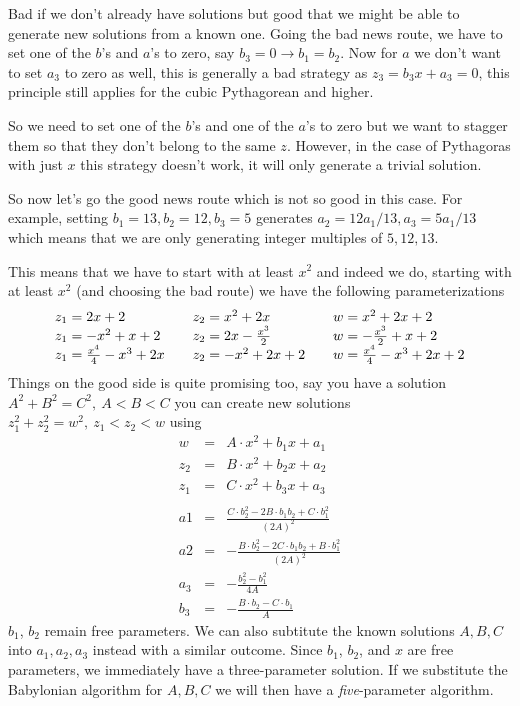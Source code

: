 \documentclass[aps,preprint,preprintnumbers,nofootinbib,showpacs,prd]{revtex4-1}
\newcommand{\ba}{\begin{array}}
\newcommand{\ea}{\end{array}}
\newcommand{\nbea}{\begin{eqnarray*}}
\newcommand{\neea}{\end{eqnarray*}}
\begin{document}
Bad if we don't already have solutions but good that we might be able to generate new solutions from a known one. Going the bad news route, we have to set one of the $b$'s and $a$'s to zero, say $
b_3=0 \to b_1 = b_2$. Now for $a$ we don't want to set $a_3$ to zero as well, this is generally a bad strategy as $z_3 = b_3 x + a_3 = 0$, this principle still applies for the cubic Pythagorean and higher.

So we need to set one of the $b$'s and one of the $a$'s to zero but we want to stagger them so that they don't belong to the same $z$. However, in the case of Pythagoras with just $x$ this strategy doesn't work, it will only generate a trivial solution.

So now let's go the good news route which is not so good in this case. For example, setting $b_1 = 13, b_2 = 12, b_3 = 5$ generates $a_2 = 12 a_1/13, a_3 = 5 a_1/13$ which means that we are only generating integer multiples of $5,12,13$.

This means that we have to start with at least $x^2$ and indeed we do, starting with at least $x^2$ (and choosing the bad route) we have the following parameterizations
%
\nbea
\ba{l l l}
z_1 = 2x + 2          &~~~ z_2 = x^2 + 2x &~~~ w = x^2 + 2x + 2 \\
z_1 = -x^2 + x + 2 &~~~ z_2 = 2x - \frac{x^3}{2} &~~~ w = -\frac{x^3}{2} + x + 2 \\
z_1 = \frac{x^4}{4} - x^3 + 2x &~~~ z_2 = -x^2 + 2x + 2 &~~~ w = \frac{x^4}{4} - x^3 + 2x + 2
\ea
\neea
%
Things on the good side is quite promising too, say you have a solution $A^2 + B^2 = C^2, ~ A < B < C$ you can create new solutions $z_1^2 + z_2^2 = w^2,~z_1 < z_2 < w$ using
%
\nbea
w & = & A \cdot x^2 + b_1 x + a_1 \\
z_2 & = & B \cdot x^2 + b_2 x + a_2 \\
z_1 & = & C \cdot x^2 + b_3 x + a_3 \\ \\
a1 & = & \frac{C\cdot b_2^2 - 2B \cdot b_1 b_2 + C \cdot b_1^2}{(2A)^2}\\
a2 & = & -\frac{B\cdot b_2^2 - 2C \cdot b_1 b_2 + B\cdot b_1^2}{(2A)^2}\\
a_3 & = & -\frac{b_2^2 - b_1^2}{4A} \\
b_3 & = & -\frac{B\cdot b_2 - C\cdot b_1}{A}
\neea
%
$b_1$, $b_2$ remain free parameters. We can also subtitute the known solutions $A, B, C$ into $a_1, a_2, a_3$ instead with a similar outcome. Since $b_1$, $b_2$, and $x$ are free parameters, we immediately have a three-parameter solution. If we substitute the Babylonian algorithm for $A,B,C$ we will then have a {\it five}-parameter algorithm.
\end{document}
